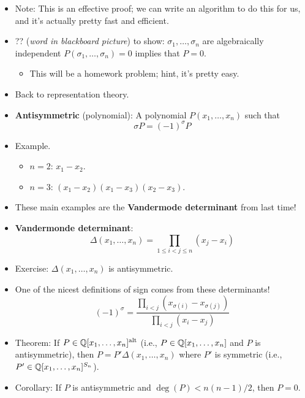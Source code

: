\documentclass[../notes.tex]{subfiles}
\begin{document}
\begin{itemize}
\begin{proof}
    \end{proof}
    \item Note: This is an effective proof; we can write an algorithm to do this for us, and it's actually pretty fast and efficient.
    \item ?? (\emph{word in blackboard picture}) to show: $\sigma_1,\dots,\sigma_n$ are algebraically independent $P(\sigma_1,\dots,\sigma_n)=0$ implies that $P=0$.
    \begin{itemize}
        \item This will be a homework problem; hint, it's pretty easy.
    \end{itemize}
    \item Back to representation theory.
    \item \textbf{Antisymmetric} (polynomial): A polynomial $P(x_1,\dots,x_n)$ such that
    \begin{equation*}
        \sigma P=(-1)^\sigma P
    \end{equation*}
    \item Example.
    \begin{itemize}
        \item $n=2$: $x_1-x_2$.
        \item $n=3$: $(x_1-x_2)(x_1-x_3)(x_2-x_3)$.
    \end{itemize}
    \item These main examples are the \textbf{Vandermode determinant} from last time!
    \item \textbf{Vandermonde determinant}:
    \begin{equation*}
        \Delta(x_1,\dots,x_n)=\prod_{1\leq i<j\leq n}(x_j-x_i)
    \end{equation*}
    \item Exercise: $\Delta(x_1,\dots,x_n)$ is antisymmetric.
    \item One of the nicest definitions of sign comes from these determinants!
    \begin{equation*}
        (-1)^\sigma = \frac{\prod_{i<j}(x_{\sigma(i)}-x_{\sigma(j)})}{\prod_{i<j}(x_i-x_j)}
    \end{equation*}
    \item Theorem: If $P\in\mathbb{Q}[x_1,\dots,x_n]^\text{alt}$ (i.e., $P\in\mathbb{Q}[x_1,\dots,x_n]$ and $P$ is antisymmetric), then $P=P'\Delta(x_1,\dots,x_n)$ where $P'$ is symmetric (i.e., $P'\in\mathbb{Q}[x_1,\dots,x_n]^{S_n}$).
    \item Corollary: If $P$ is antisymmetric and $\deg(P)<n(n-1)/2$, then $P=0$.
    \begin{itemize}

\end{itemize}
\end{itemize}
\end{document}
